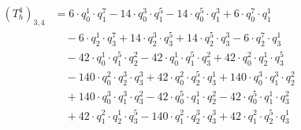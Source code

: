 \begin{align*}(T_{h}^4)_{3,4}&=6\cdot q_0^{1}\cdot q_1^{7}-14\cdot q_0^{3}\cdot q_1^{5}-14\cdot q_0^{5}\cdot q_1^{3}+6\cdot q_0^{7}\cdot q_1^{1}\\
&\quad -6\cdot q_2^{1}\cdot q_3^{7}+14\cdot q_2^{3}\cdot q_3^{5}+14\cdot q_2^{5}\cdot q_3^{3}-6\cdot q_2^{7}\cdot q_3^{1}\\
&\quad -42\cdot q_0^{1}\cdot q_1^{5}\cdot q_2^{2}-42\cdot q_0^{1}\cdot q_1^{5}\cdot q_3^{2}+42\cdot q_0^{2}\cdot q_2^{1}\cdot q_3^{5}\\
&\quad -140\cdot q_0^{2}\cdot q_2^{3}\cdot q_3^{3}+42\cdot q_0^{2}\cdot q_2^{5}\cdot q_3^{1}+140\cdot q_0^{3}\cdot q_1^{3}\cdot q_2^{2}\\
&\quad +140\cdot q_0^{3}\cdot q_1^{3}\cdot q_3^{2}-42\cdot q_0^{5}\cdot q_1^{1}\cdot q_2^{2}-42\cdot q_0^{5}\cdot q_1^{1}\cdot q_3^{2}\\
&\quad +42\cdot q_1^{2}\cdot q_2^{1}\cdot q_3^{5}-140\cdot q_1^{2}\cdot q_2^{3}\cdot q_3^{3}+42\cdot q_1^{2}\cdot q_2^{5}\cdot q_3^{1}\end{align*}
